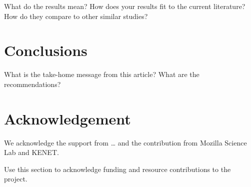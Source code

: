 What do the results mean? How does your results fit to the current
literature? How do they compare to other similar studies?

\section*{Conclusions}\label{conclusions}

What is the take-home message from this article? What are the
recommendations?

\section{Acknowledgement}\label{acknowledgement}

We acknowledge the support from \ldots{} and the contribution from
Mozilla Science Lab and KENET.

Use this section to acknowledge funding and resource contributions to
the project.
